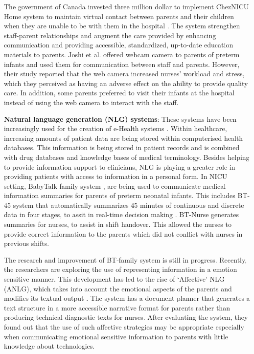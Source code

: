 The government of Canada invested three million dollar to implement ChezNICU Home system to maintain virtual contact between parents  and their children when they are unable to be with them in the hospital \citep{McNutt2017}. The system strengthen staff-parent relationships and augment the care provided by enhancing communication and providing accessible, standardized, up-to-date education materials to parents. Joshi et al. \citep{Joshi2016} offered webcam camera to parents of preterm infants and used them for communication between staff and parents. However, their study reported that the web camera increased nurses' workload and stress, which they perceived as having an adverse effect on the ability to provide quality care. In addition, some parents preferred to visit their infants at the hospital instead of using the web camera to interact with the staff. 


\textbf{Natural language generation (NLG) systems}: These systems have been increasingly used for the creation of e-Health systems \citep{Hueske-kraus2003,Pauws2018, Lindahl2005}. Within healthcare, increasing amounts of patient data are being stored within computerised health databases. This information is being stored in patient records and is combined with drug databases and knowledge bases of medical terminology. Besides helping to provide information support to clinicians, NLG is playing a greater role in providing patients with access to information in a personal form. In NICU setting, BabyTalk family system \citep{Mahamood2011}, are being used to communicate medical information summaries for parents of preterm neonatal infants. This includes BT-45 system that automatically summarizes 45 minutes of continuous and discrete data in four stages, to assit in real-time decision making \citep{Gatt2009}. BT-Nurse \citep{Hunter2011} generates summaries for nurses, to assist in shift handover. This allowed the nurses to provide correct information to the parents which did not conflict with nurses in previous shifts.

The research and improvement of BT-family system is still in progress. Recently, the researchers are exploring the use of representing information in a emotion sensitive manner. This development has led to the rise of ‘Affective’ NLG (ANLG), which takes into account the emotional aspects of the parents and modifies its textual output  \citep{Mahamood2011}. The system has a document planner that generates a text structure in a more accessible narrative format for parents rather than producing technical diagnostic texts for nurses. After evaluating the system, they found out that the use of such affective strategies may be appropriate especially when communicating emotional sensitive information to parents with little knowledge about technologies.

